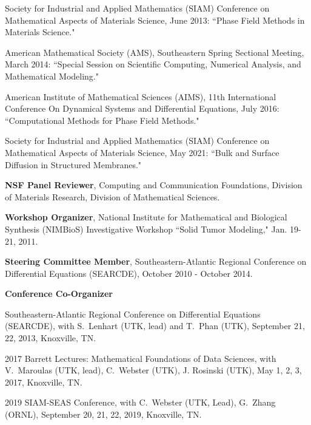 \documentclass[11pt]{letter}
\begin{document}
\begin{description}
\begin{description}
\begin{description}
    \item
Society for Industrial and Applied Mathematics (SIAM) Conference on Mathematical Aspects of Materials Science, June 2013: ``Phase Field Methods in Materials Science."
	\item
American Mathematical Society (AMS), Southeastern Spring Sectional Meeting, March 2014: ``Special Session on Scientific Computing, Numerical Analysis, and Mathematical Modeling."
	\item
American Institute of Mathematical Sciences (AIMS), 11th International Conference On Dynamical Systems and Differential Equations, July 2016: ``Computational Methods for Phase Field Methods."
    \item
Society for Industrial and Applied Mathematics (SIAM) Conference on Mathematical Aspects of Materials Science, May 2021: ``Bulk and Surface Diffusion in Structured Membranes."
	\end{description}
	\item
\textbf{NSF Panel Reviewer}, Computing and Communication Foundations, Division of Materials Research, Division of Mathematical Sciences.
	\item
\textbf{Workshop Organizer}, National Institute for Mathematical and Biological Synthesis (NIMBioS) Investigative Workshop ``Solid Tumor Modeling," Jan. 19-21, 2011.
	\item
\textbf{Steering Committee Member}, Southeastern-Atlantic Regional Conference on Differential Equations (SEARCDE), October 2010 - October 2014.
	\item
\textbf{Conference Co-Organizer} 
	\begin{description}
	\item 
Southeastern-Atlantic Regional Conference on Differential Equations (SEARCDE), with S.~Lenhart (UTK, lead) and T.~Phan (UTK), September 21, 22, 2013, Knoxville, TN.
	\item
2017 Barrett Lectures: Mathematical Foundations of Data Sciences, with V.~Maroulas (UTK, lead), C.~Webster (UTK), J. Rosinski (UTK), May 1, 2, 3, 2017, Knoxville, TN.
	\item
2019 SIAM-SEAS Conference, with C.~Webster (UTK, Lead), G.~Zhang (ORNL), September 20, 21, 22, 2019, Knoxville, TN.
	\end{description}
    \end{description}
    \end{description}
    
    \smallskip
\end{document}
